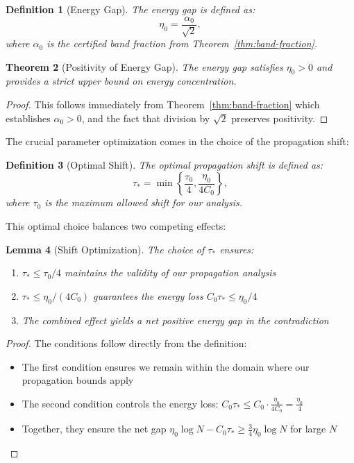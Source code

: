 \documentclass[11pt,hyp,]{nyjm}
\newtheorem{theorem}{Theorem}
\newtheorem{lemma}[theorem]{Lemma}
\newtheorem{definition}[theorem]{Definition}
\begin{document}
\begin{definition}[Energy Gap]\label{def:energy-gap}
The energy gap is defined as:
\[
\eta_0 = \frac{\alpha_0}{\sqrt{2}},
\]
where $\alpha_0$ is the certified band fraction from Theorem~\ref{thm:band-fraction}.
\end{definition}

\begin{theorem}[Positivity of Energy Gap]\label{thm:eta-positivity}
The energy gap satisfies $\eta_0 > 0$ and provides a strict upper bound on energy concentration.
\end{theorem}

\begin{proof}
This follows immediately from Theorem~\ref{thm:band-fraction} which establishes $\alpha_0 > 0$, and the fact that division by $\sqrt{2}$ preserves positivity.
\end{proof}

The crucial parameter optimization comes in the choice of the propagation shift:

\begin{definition}[Optimal Shift]\label{def:optimal-shift}
The optimal propagation shift is defined as:
\[
\tau_* = \min\left\{\frac{\tau_0}{4}, \frac{\eta_0}{4C_0}\right\},
\]
where $\tau_0$ is the maximum allowed shift for our analysis.
\end{definition}

This optimal choice balances two competing effects:

\begin{lemma}[Shift Optimization]\label{lem:shift-optimization}
The choice of $\tau_*$ ensures:
\begin{enumerate}
\item $\tau_* \leq \tau_0/4$ maintains the validity of our propagation analysis
\item $\tau_* \leq \eta_0/(4C_0)$ guarantees the energy loss $C_0\tau_* \leq \eta_0/4$
\item The combined effect yields a net positive energy gap in the contradiction
\end{enumerate}
\end{lemma}

\begin{proof}
The conditions follow directly from the definition:
\begin{itemize}
\item The first condition ensures we remain within the domain where our propagation bounds apply
\item The second condition controls the energy loss: $C_0\tau_* \leq C_0 \cdot \frac{\eta_0}{4C_0} = \frac{\eta_0}{4}$
\item Together, they ensure the net gap $\eta_0\log N - C_0\tau_* \geq \frac{3}{4}\eta_0\log N$ for large $N$
\end{itemize}
\end{proof}
\end{document}
